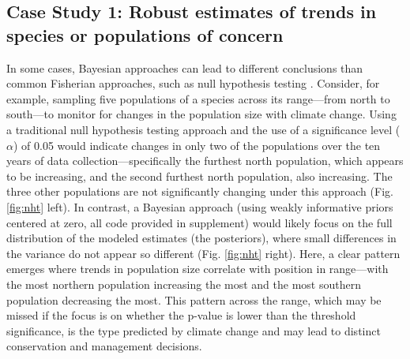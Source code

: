 \documentclass{article}
\begin{document}
\subsection*{Case Study 1: Robust estimates of trends in species or populations of concern}
\par In some cases, Bayesian approaches can lead to different conclusions than common Fisherian approaches, such as null hypothesis testing \citep{wade2000bayesian}. Consider, for example, sampling five populations of a species across its range---from north to south---to monitor for changes in the population size with climate change. 
\color{red}Using a traditional null hypothesis testing approach and the use of a significance level ($\alpha$) of 0.05 would indicate changes in only two of the populations over the ten years of data collection---specifically the furthest north population, which appears to be increasing, and the second furthest north population, also increasing. \color{black}The three other populations are not significantly changing under this approach (Fig. \ref{fig:nht} left). In contrast, a Bayesian approach (using weakly informative priors centered at zero, all code provided in supplement) would likely focus on the full distribution of the modeled estimates (the posteriors), where small differences in the variance do not appear so different  (Fig. \ref{fig:nht} right).
Here, a clear pattern emerges where trends in population size correlate with position in range---with the most northern population increasing the most and the most southern population decreasing the most. This pattern across the range, which may be missed if the focus is on whether the p-value is lower than the threshold significance, is the type predicted by climate change and may lead to distinct  conservation and management decisions. %
\end{document}
